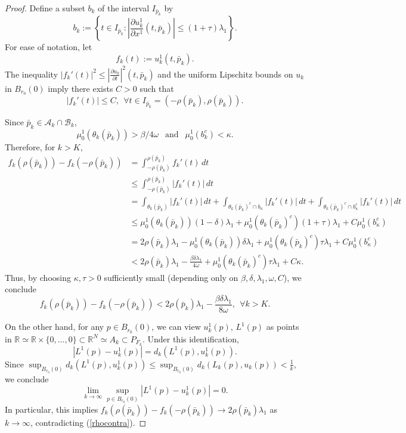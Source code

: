 \documentclass[10pt,a4paper]{amsart}
\newcommand{\PFk}{P_{F_k}}
\newcommand{\R}{\mathbb R}
\begin{document}
\begin{proof}
Define a subset $b_k$ of the interval $I_{\bar p_{k}}$ by
\[
 b_k:=\left \{t \in I_{\bar p_k}: \left| \frac{\partial u^1_k}{\partial x^1} (t, \bar p_k) \right| \leq (1+\tau) \lambda_1 \right\}.
\]
For ease of notation, let $$
f_k(t):= u_k^1(t, \bar p_k).
$$
 The inequality $|f_k'(t)|^2 \leq \left|\frac{\partial u_k}{\partial  t}\right|^2(t, \bar p_k)$ and the uniform Lipschitz bounds on $u_k$ in $B_{r_0}(0)$ imply there exists $C>0$ such that 
 $$
 |f_k'(t)| \leq C, \ \ \forall t \in I_{\bar p_k}=(-\rho(\bar p_k), \rho(\bar p_k)).$$


Since $\bar p_k \in \mathcal A_k \cap  \mathcal B_k$,
\[
\mu_0^1(\theta_k(\bar p_k)) > \beta/4\omega \ \ \mbox{ and } \ \ 
\mu_0^1(b_k^c)<\kappa.
\]
Therefore, for $k >K$,
\begin{align*}
f_k(\rho(\bar p_k))- f_k(-\rho(\bar p_k))&=
 \int_{-\rho(\bar p_k)} ^{\rho(\bar p_k)}f_k'(t)\, dt
  \nonumber \\
& \leq \int_{-\rho(\bar p_k)} ^{\rho(\bar p_k)}|f_k'(t)|\, dt \nonumber \\
&=\int_{\theta_k(\bar p_k)} |f_k'(t)|\, dt+\int_{\theta_k(\bar p_k)^c \cap b_\kappa} |f_k'(t)|\, dt+\int_{\theta_k(\bar p_k)^c \cap b_\kappa^c} |f_k'(t)|\, dt 
\nonumber \\
& \leq\mu_0^1(\theta_k(\bar p_k))(1-\delta)\lambda_1+ \mu_0^1(\theta_k(\bar p_k)^c) (1+\tau) \lambda_1+ C \mu_0^1(b_\kappa^c)\nonumber \\
& =   2 \rho(\bar p_k)  \lambda_1
-\mu_0^1(\theta_k(\bar p_k))\delta \lambda_1+ \mu_0^1(\theta_k(\bar p_k)^c) \tau \lambda_1+ C \mu_0^1(b_\kappa^c) \nonumber
\\
&< 2 \rho(\bar p_k)  \lambda_1
-\frac{\beta \delta \lambda_1}{4\omega}+ \mu_0^1(\theta_k(\bar p_k)^c) \tau \lambda_1+ C \kappa. \nonumber
\end{align*}
Thus, by choosing $\kappa, \tau>0$ sufficiently small (depending only on $\beta, \delta, \lambda_1, \omega, C$), we conclude
\begin{equation} \label{rhocontra}
f_k(\rho(\bar p_k))- f_k(-\rho(\bar p_k)) <  2 \rho(\bar p_k)  \lambda_1
-\frac{\beta \delta \lambda_1}{8\omega}, \ \ \forall k >K.
\end{equation}

On the other hand, for any $p \in B_{r_0}(0)$, we can view $u_k^1(p)$, $L^1(p)$ as points in $\R \simeq  \R \times \{0,\dots, 0\} \subset \R^N \simeq A_k \subset \PFk$.  Under this identification,
\[
|L^1(p)- u_k^1(p)| = d_k(L^1(p),  u_k^1(p)).
\]
Since $\sup_{B_{r_0}(0)} d_k(L^1(p),u_k^1(p)) 
   \leq 
   \sup_{B_{r_0}(0)} d_k(L_k(p), u_k(p)) < \frac{1}{k}$,
   we conclude
\[
\lim_{k \rightarrow \infty}  \sup_{p \in B_{r_0}(0)}|L^1(p)- u_k^1(p)| = 0.
\]
In particular, this implies $f_k(\rho(\bar p_k))- f_k(-\rho(\bar p_k)) \to 2 \rho(\bar p_k)\lambda_1$ as $k \rightarrow \infty$, contradicting (\ref{rhocontra}).
\end{proof}
\end{document}
